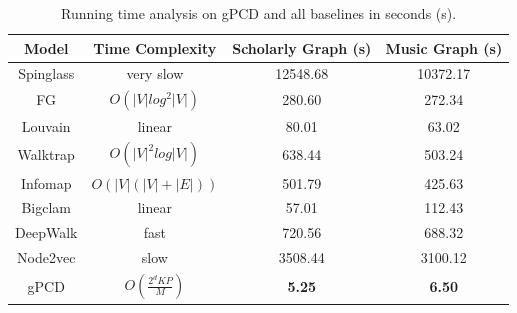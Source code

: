 \begin{table}[h]
	\centering
	\begin{tabular}{|c|c|c|c|} 
		\hline
		\textbf{Model}& \textbf{Time Complexity} & \textbf{Scholarly Graph} (s)	& \textbf{Music Graph} (s) \\ \hline
		Spinglass& very slow &12548.68	& 10372.17 \\ 
		FG& $O(|V|log^2|V|)$&280.60	& 272.34 \\ 
		Louvain& linear&80.01	&63.02 \\ 
		Walktrap&$O(|V|^2log|V|)$& 638.44	& 503.24 \\
		Infomap&$O(|V|(|V|+|E|))$ &501.79	&425.63 \\ 
		Bigclam&linear &57.01 	& 112.43 \\ 
		DeepWalk& fast&720.56	& 688.32 \\ 
		Node2vec& slow&	3508.44&3100.12 \\ 
		gPCD&$O(\frac{2^dKP}{M})$ &\textbf{5.25} &\textbf{6.50} \\ 
		\hline
	\end{tabular}
	\caption{Running time analysis on gPCD and all baselines in seconds (s).}
	\label{tab:complexity}
\end{table}

